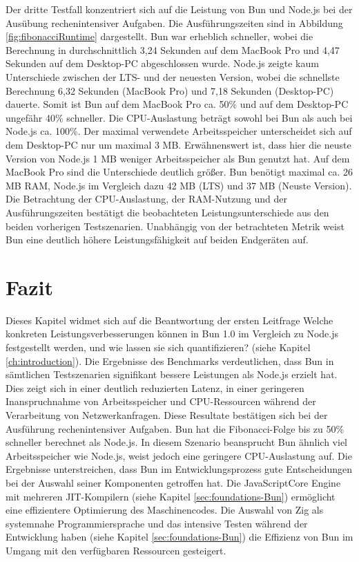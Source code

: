 \noindent
Der dritte Testfall konzentriert sich auf die Leistung von Bun und Node.js bei der Ausübung rechenintensiver Aufgaben. Die Ausführungszeiten sind in Abbildung \ref{fig:fibonacciRuntime} dargestellt. Bun war erheblich schneller, wobei die Berechnung in durchschnittlich 3,24 Sekunden auf dem MacBook Pro und 4,47 Sekunden auf dem Desktop-PC abgeschlossen wurde. Node.js zeigte kaum Unterschiede zwischen der LTS- und der neuesten Version, wobei die schnellste Berechnung 6,32 Sekunden (MacBook Pro) und 7,18 Sekunden (Desktop-PC) dauerte. Somit ist Bun auf dem MacBook Pro ca. 50\% und auf dem Desktop-PC ungefähr 40\% schneller. Die CPU-Auslastung beträgt sowohl bei Bun als auch bei Node.js ca. 100\%. Der maximal verwendete Arbeitsspeicher unterscheidet sich auf dem Desktop-PC nur um maximal 3 MB. Erwähnenswert ist, dass hier die neuste Version von Node.js 1 MB weniger Arbeitsspeicher als Bun genutzt hat. Auf dem MacBook Pro sind die Unterschiede deutlich größer. Bun benötigt maximal ca. 26 MB RAM, Node.js im Vergleich dazu 42 MB (LTS) und 37 MB (Neuste Version).\newline
Die Betrachtung der CPU-Auslastung, der RAM-Nutzung und der Ausführungszeiten bestätigt die beobachteten Leistungsunterschiede aus den beiden vorherigen Testszenarien. Unabhängig von der betrachteten Metrik weist Bun eine deutlich höhere Leistungsfähigkeit auf beiden Endgeräten auf.

\section{Fazit} \label{sec:performance-conclusion}
Dieses Kapitel widmet sich auf die Beantwortung der ersten Leitfrage \glqq Welche konkreten Leistungsverbesserungen können in Bun 1.0 im Vergleich zu Node.js festgestellt werden, und wie lassen sie sich quantifizieren?\grqq{} (siehe Kapitel \ref{ch:introduction}). Die Ergebnisse des Benchmarks verdeutlichen, dass Bun in sämtlichen Testszenarien signifikant bessere Leistungen als Node.js erzielt hat. Dies zeigt sich in einer deutlich reduzierten Latenz, in einer geringeren Inanspruchnahme von Arbeitsspeicher und CPU-Ressourcen während der Verarbeitung von Netzwerkanfragen. Diese Resultate bestätigen sich bei der Ausführung rechenintensiver Aufgaben. Bun hat die Fibonacci-Folge bis zu 50\% schneller berechnet als Node.js. In diesem Szenario beansprucht Bun ähnlich viel Arbeitsspeicher wie Node.js, weist jedoch eine geringere CPU-Auslastung auf. \newline
Die Ergebnisse unterstreichen, dass Bun im Entwicklungsprozess gute Entscheidungen bei der Auswahl seiner Komponenten getroffen hat. Die JavaScriptCore Engine mit mehreren JIT-Kompilern (siehe Kapitel \ref{sec:foundations-Bun}) ermöglicht eine effizientere Optimierung des Maschinencodes. Die Auswahl von Zig als systemnahe Programmiersprache und das intensive Testen während der Entwicklung haben (siehe Kapitel \ref{sec:foundations-Bun}) die Effizienz von Bun im Umgang mit den verfügbaren Ressourcen gesteigert.\\

